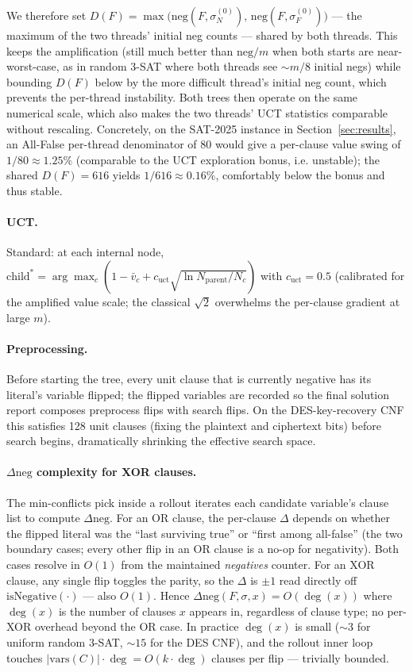 \documentclass[11pt]{article}
\begin{document}
We therefore set
$D(F) = \max\bigl(\mathrm{neg}(F,\sigma^{(0)}_N),\,
                  \mathrm{neg}(F,\sigma^{(0)}_F)\bigr)$
— the maximum of the two threads' initial neg counts — shared by
both threads. This keeps the amplification (still much better than
$\mathrm{neg}/m$ when both starts are near-worst-case, as in random
3-SAT where both threads see $\sim m/8$ initial negs) while bounding
$D(F)$ below by the more difficult thread's initial neg count,
which prevents the per-thread instability. Both trees then operate
on the same numerical scale, which also makes the two threads'
UCT statistics comparable without rescaling. Concretely, on the
SAT-2025 instance in Section~\ref{sec:results}, an All-False
per-thread denominator of 80 would give a per-clause value swing
of $1/80 \approx 1.25\%$ (comparable to the UCT exploration bonus,
i.e. unstable); the shared $D(F) = 616$ yields $1/616 \approx
0.16\%$, comfortably below the bonus and thus stable.

\paragraph{UCT.} Standard: at each internal node,
$\text{child}^* = \arg\max_c \left( 1 - \bar v_c
   + c_\text{uct} \sqrt{\ln N_\text{parent} / N_c} \right)$
with $c_\text{uct} = 0.5$ (calibrated for the amplified value scale;
the classical $\sqrt 2$ overwhelms the per-clause gradient at large
$m$).

\paragraph{Preprocessing.} Before starting the tree, every unit
clause that is currently negative has its literal's variable flipped;
the flipped variables are recorded so the final solution report
composes preprocess flips with search flips. On the DES-key-recovery
CNF this satisfies 128 unit clauses (fixing the plaintext and
ciphertext bits) before search begins, dramatically shrinking the
effective search space.

\paragraph{$\Delta\mathrm{neg}$ complexity for XOR clauses.} The
min-conflicts pick inside a rollout iterates each candidate
variable's clause list to compute $\Delta\mathrm{neg}$. For an OR
clause, the per-clause $\Delta$ depends on whether the flipped
literal was the ``last surviving true'' or ``first among all-false''
(the two boundary cases; every other flip in an OR clause is a no-op
for negativity). Both cases resolve in $O(1)$ from the maintained
\emph{negatives} counter. For an XOR clause, any single flip toggles
the parity, so the $\Delta$ is $\pm 1$ read directly off
$\mathrm{isNegative}(\cdot)$ — also $O(1)$. Hence
$\Delta\mathrm{neg}(F, \sigma, x) = O(\deg(x))$ where $\deg(x)$ is
the number of clauses $x$ appears in, regardless of clause type;
no per-XOR overhead beyond the OR case. In practice $\deg(x)$ is
small ($\sim 3$ for uniform random 3-SAT, $\sim 15$ for the DES
CNF), and the rollout inner loop touches
$|\mathrm{vars}(C)| \cdot \deg = O(k \cdot \deg)$ clauses per flip
— trivially bounded.
\end{document}

